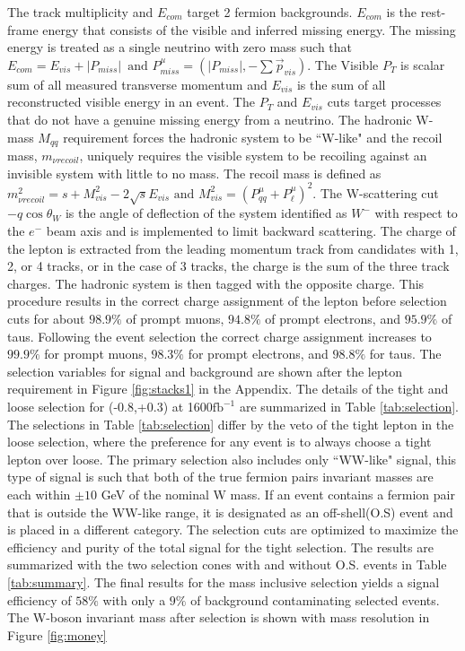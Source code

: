 The track multiplicity and $E_{com}$ target 2 fermion backgrounds. $E_{com}$ is the rest-frame energy that consists of the visible and inferred missing energy. The missing energy is treated as a single neutrino with zero mass such that $E_{com} = E_{vis} + |P_{miss}| \, \,  \, \text{and} \, \, P^\mu_{miss} = (|P_{miss}| , -\sum{\vec{p}_{vis}})$. The Visible $P_T$ is scalar sum of all measured transverse momentum and $E_{vis}$ is the sum of all reconstructed visible energy in an event. The $P_T$ and $E_{vis}$ cuts target processes that do not have a genuine missing energy from a neutrino. The hadronic W-mass $M_{qq}$ requirement forces the hadronic system to be ``W-like" and the recoil mass, $m_{\nu recoil}$, uniquely requires the visible system to be recoiling against an invisible system with little to no mass. The recoil mass is defined as $m^2_{\nu recoil} = s + M^2_{vis} - 2\sqrt{s}E_{vis} \, \, \text{and} \, \, M^2_{vis} = ( P^{\mu}_{qq} +  P^{\mu}_{\ell})^2$. The W-scattering cut $-q\cos\theta_W$ is the angle of deflection of the system identified as $W^-$ with respect to the $e^-$ beam axis and is implemented to limit backward scattering.  The charge of the lepton is extracted from the leading momentum track from candidates with 1, 2, or 4 tracks, or in the case of 3 tracks, the charge is the sum of the three track charges. The hadronic system is then tagged with the opposite charge.  This procedure results in the correct charge assignment of the lepton before selection cuts for about $98.9\%$ of prompt muons, $94.8\%$ of prompt electrons, and $95.9\%$ of taus. Following the event selection the correct charge assignment increases to $99.9\%$ for prompt muons, $98.3\%$ for prompt electrons, and $98.8\%$ for taus. The selection variables for signal and background are shown after the lepton requirement in Figure \ref{fig:stacks1} in the Appendix.  The details of the tight and loose selection for (-0.8,+0.3) at 1600$\text{fb}^{-1}$ are summarized in Table \ref{tab:selection}. The selections in Table \ref{tab:selection} differ by the veto of the tight lepton in the loose selection, where the preference for any event is to always choose a tight lepton over loose. The primary selection also includes only ``WW-like" signal, this type of signal is such that both of the true fermion pairs invariant masses are each within $\pm10$ GeV of the nominal W mass. If an event contains a fermion pair that is outside the WW-like range, it is designated as an off-shell(O.S) event and is placed in a different category. The selection cuts are optimized to maximize the efficiency and purity of the total signal for the tight selection. The results are summarized with the two selection cones with and without O.S. events in Table \ref{tab:summary}. The final results for the mass inclusive selection yields a signal efficiency of $58\%$ with only a $9\%$ of background contaminating selected events. The W-boson invariant mass after selection is shown with mass resolution in Figure \ref{fig:money}


